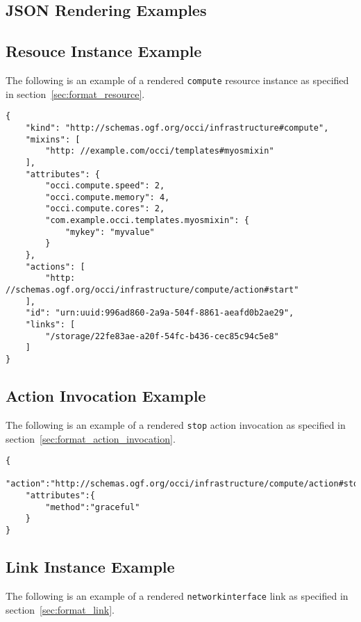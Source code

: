 \documentclass[10pt,a4paper]{article}
\begin{document}
\clearpage
\begin{appendices}
\section{JSON Rendering Examples}
\subsection{Resouce Instance Example}
\label{resouce_instance_rendering_example}

The following is an example of a rendered \texttt{compute} resource instance as specified in section~\ref{sec:format_resource}.

\begin{lstlisting}
{
    "kind": "http://schemas.ogf.org/occi/infrastructure#compute",
    "mixins": [
        "http: //example.com/occi/templates#myosmixin"
    ],
    "attributes": {
        "occi.compute.speed": 2,
        "occi.compute.memory": 4,
        "occi.compute.cores": 2,
        "com.example.occi.templates.myosmixin": {
            "mykey": "myvalue"
        }
    },
    "actions": [
        "http: //schemas.ogf.org/occi/infrastructure/compute/action#start"
    ],
    "id": "urn:uuid:996ad860-2a9a-504f-8861-aeafd0b2ae29",
    "links": [
        "/storage/22fe83ae-a20f-54fc-b436-cec85c94c5e8"
    ]
}
\end{lstlisting}

\subsection{Action Invocation Example}
\label{action_invocation_rendering_example}

The following is an example of a rendered \texttt{stop} action invocation as specified in section~\ref{sec:format_action_invocation}.

\begin{lstlisting}
{
    "action":"http://schemas.ogf.org/occi/infrastructure/compute/action#stop",
    "attributes":{
        "method":"graceful"
    }
}
\end{lstlisting}

\subsection{Link Instance Example}
\label{link_instance_rendering_example}

The following is an example of a rendered \texttt{networkinterface} link as specified in section~\ref{sec:format_link}.



\end{appendices}
\end{document}
